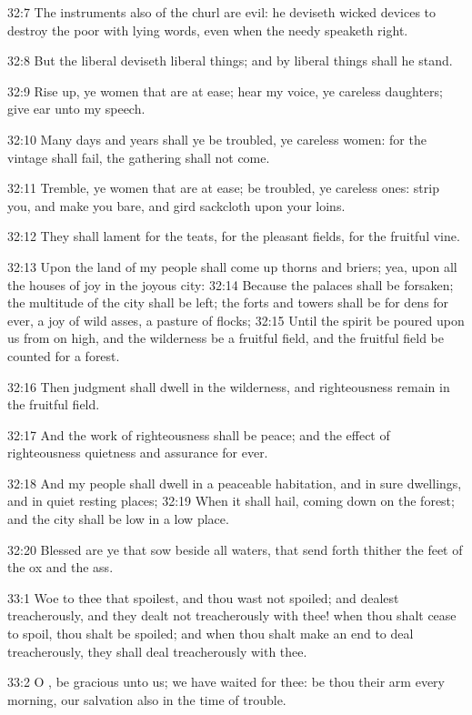 32:7 The instruments also of the churl are evil: he deviseth wicked devices to destroy the poor with lying words, even when the needy speaketh right.

32:8 But the liberal deviseth liberal things; and by liberal things shall he stand.

32:9 Rise up, ye women that are at ease; hear my voice, ye careless daughters; give ear unto my speech.

32:10 Many days and years shall ye be troubled, ye careless women: for the vintage shall fail, the gathering shall not come.

32:11 Tremble, ye women that are at ease; be troubled, ye careless ones: strip you, and make you bare, and gird sackcloth upon your loins.

32:12 They shall lament for the teats, for the pleasant fields, for the fruitful vine.

32:13 Upon the land of my people shall come up thorns and briers; yea, upon all the houses of joy in the joyous city: 32:14 Because the palaces shall be forsaken; the multitude of the city shall be left; the forts and towers shall be for dens for ever, a joy of wild asses, a pasture of flocks; 32:15 Until the spirit be poured upon us from on high, and the wilderness be a fruitful field, and the fruitful field be counted for a forest.

32:16 Then judgment shall dwell in the wilderness, and righteousness remain in the fruitful field.

32:17 And the work of righteousness shall be peace; and the effect of righteousness quietness and assurance for ever.

32:18 And my people shall dwell in a peaceable habitation, and in sure dwellings, and in quiet resting places; 32:19 When it shall hail, coming down on the forest; and the city shall be low in a low place.

32:20 Blessed are ye that sow beside all waters, that send forth thither the feet of the ox and the ass.

33:1 Woe to thee that spoilest, and thou wast not spoiled; and dealest treacherously, and they dealt not treacherously with thee! when thou shalt cease to spoil, thou shalt be spoiled; and when thou shalt make an end to deal treacherously, they shall deal treacherously with thee.

33:2 O \LORD, be gracious unto us; we have waited for thee: be thou their arm every morning, our salvation also in the time of trouble.


